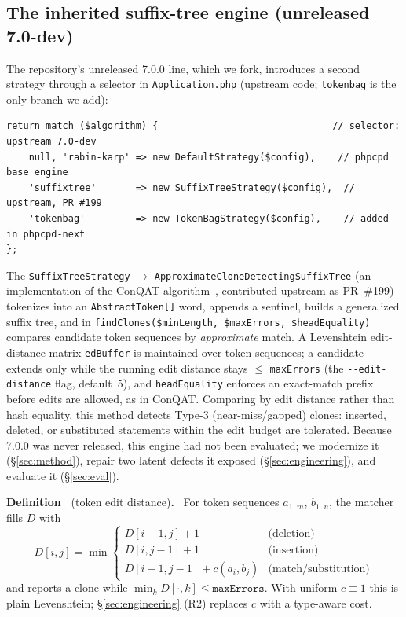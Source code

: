 \documentclass[10pt,a4paper]{article}
\newcounter{defn}[section]
\newcommand{\defn}[1]{\par\medskip\refstepcounter{defn}%
  \noindent\textbf{Definition~\thedefn} (#1)\textbf{.}\ }
\newcounter{lem}[section]
\begin{document}
\subsection{The inherited suffix-tree engine (unreleased 7.0-dev)}
The repository's unreleased 7.0.0 line, which we fork, introduces a second strategy through a selector
in \texttt{Application.php} (upstream code; \texttt{tokenbag} is the only branch we add):

\begin{lstlisting}[basicstyle=\ttfamily\small]
return match ($algorithm) {                               // selector: upstream 7.0-dev
    null, 'rabin-karp' => new DefaultStrategy($config),    // phpcpd base engine
    'suffixtree'       => new SuffixTreeStrategy($config),  // upstream, PR #199
    'tokenbag'         => new TokenBagStrategy($config),    // added in phpcpd-next
};
\end{lstlisting}

The \texttt{SuffixTreeStrategy} $\rightarrow$ \texttt{ApproximateCloneDetectingSuffixTree} (an
implementation of the ConQAT algorithm~\cite{conqat}, contributed upstream as PR~\#199) tokenizes into
an \texttt{AbstractToken[]} word, appends a sentinel, builds a generalized suffix tree, and in
\lstinline!findClones($minLength, $maxErrors, $headEquality)! compares candidate token sequences by
\emph{approximate} match. A Levenshtein edit-distance matrix \lstinline!edBuffer! is maintained over
token sequences; a candidate extends only while the running edit distance stays $\le$ \texttt{maxErrors}
(the \texttt{-{}-edit-distance} flag, default~5), and \texttt{headEquality} enforces an exact-match
prefix before edits are allowed, as in ConQAT. Comparing by edit distance rather than hash equality,
this method detects Type-3 (near-miss/gapped) clones: inserted, deleted, or substituted statements
within the edit budget are tolerated. Because 7.0.0 was never released, this engine had not been
evaluated; we modernize it (\S\ref{sec:method}), repair two latent defects it exposed
(\S\ref{sec:engineering}), and evaluate it (\S\ref{sec:eval}).

\defn{token edit distance}
For token sequences $a_{1..m}$, $b_{1..n}$, the matcher fills $D$ with
\[
D[i,j]=\min\!\begin{cases}
D[i\!-\!1,j]+1 & \text{(deletion)}\\
D[i,j\!-\!1]+1 & \text{(insertion)}\\
D[i\!-\!1,j\!-\!1]+c(a_i,b_j) & \text{(match/substitution)}
\end{cases}
\]
and reports a clone while $\min_k D[\cdot,k]\le \texttt{maxErrors}$. With uniform $c\equiv 1$ this is
plain Levenshtein; \S\ref{sec:engineering} (R2) replaces $c$ with a type-aware cost.
\end{document}
